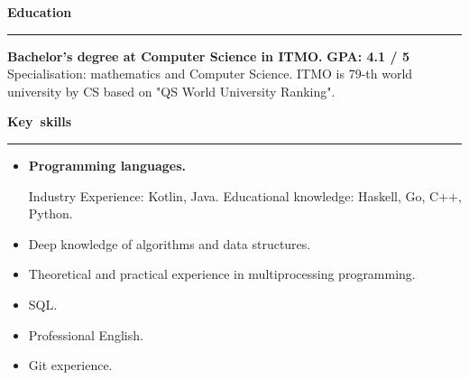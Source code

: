 \documentclass[10pt, a4paper]{report}
\begin{document}
 \par\hbox{\large\textbf{Education}}\kern5pt\hrule\kern5pt

    \textbf{Bachelor's degree at Computer Science in ITMO.}
    \hfill
    \textbf{ GPA: 4.1 / 5} \\
        Specialisation: mathematics and Computer Science. ITMO is 79-th world university by CS based on "QS World University Ranking".\\


    \par\hbox{\large\textbf{Key skills}}\kern5pt\hrule\kern5pt

    \begin{itemize}

        \item \textbf{Programming languages.}

        Industry Experience: Kotlin, Java. Educational knowledge: Haskell, Go, C++, Python.

        \item Deep knowledge of algorithms and data structures.
        \item Theoretical and practical experience in multiprocessing programming.
        \item SQL.
        \item Professional English.
        \item Git experience.
        \\
    \end{itemize}
\end{document}
